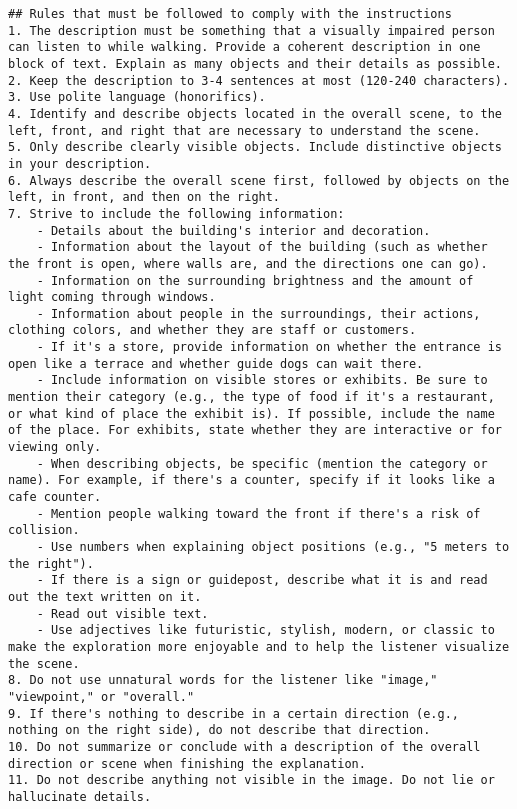 \begin{lstlisting}
## Rules that must be followed to comply with the instructions  
1. The description must be something that a visually impaired person can listen to while walking. Provide a coherent description in one block of text. Explain as many objects and their details as possible.  
2. Keep the description to 3-4 sentences at most (120-240 characters).  
3. Use polite language (honorifics).  
4. Identify and describe objects located in the overall scene, to the left, front, and right that are necessary to understand the scene.  
5. Only describe clearly visible objects. Include distinctive objects in your description.  
6. Always describe the overall scene first, followed by objects on the left, in front, and then on the right.  
7. Strive to include the following information:
    - Details about the building's interior and decoration.
    - Information about the layout of the building (such as whether the front is open, where walls are, and the directions one can go).
    - Information on the surrounding brightness and the amount of light coming through windows.
    - Information about people in the surroundings, their actions, clothing colors, and whether they are staff or customers.
    - If it's a store, provide information on whether the entrance is open like a terrace and whether guide dogs can wait there.
    - Include information on visible stores or exhibits. Be sure to mention their category (e.g., the type of food if it's a restaurant, or what kind of place the exhibit is). If possible, include the name of the place. For exhibits, state whether they are interactive or for viewing only.
    - When describing objects, be specific (mention the category or name). For example, if there's a counter, specify if it looks like a cafe counter.
    - Mention people walking toward the front if there's a risk of collision.
    - Use numbers when explaining object positions (e.g., "5 meters to the right").
    - If there is a sign or guidepost, describe what it is and read out the text written on it.
    - Read out visible text.
    - Use adjectives like futuristic, stylish, modern, or classic to make the exploration more enjoyable and to help the listener visualize the scene.
8. Do not use unnatural words for the listener like "image," "viewpoint," or "overall."
9. If there's nothing to describe in a certain direction (e.g., nothing on the right side), do not describe that direction.  
10. Do not summarize or conclude with a description of the overall direction or scene when finishing the explanation.  
11. Do not describe anything not visible in the image. Do not lie or hallucinate details.


\end{lstlisting}
